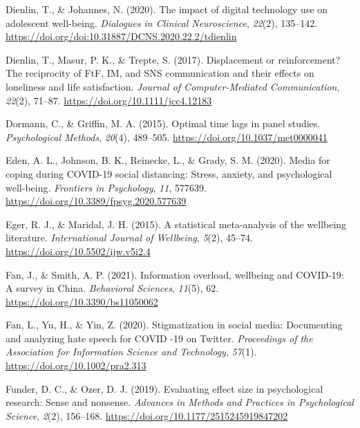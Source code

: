 \documentclass[
  man,mask,floatsintext]{apa7}
\newlength{\cslhangindent}
\newlength{\cslentryspacingunit} %
\newenvironment{CSLReferences}[2] %
 {%
  \setlength{\parindent}{0pt}
  \ifodd #1
  \let\oldpar\par
  \def\par{\hangindent=\cslhangindent\oldpar}
  \fi
  \setlength{\parskip}{#2\cslentryspacingunit}
 }%
 {}
\begin{document}
\begin{CSLReferences}{1}{0}
\leavevmode{}%
Dienlin, T., \& Johannes, N. (2020). The impact of digital technology use on adolescent well-being. \emph{Dialogues in Clinical Neuroscience}, \emph{22}(2), 135--142. \url{https://doi.org/doi:10.31887/DCNS.2020.22.2/tdienlin}

\leavevmode{}%
Dienlin, T., Masur, P. K., \& Trepte, S. (2017). Displacement or reinforcement? {The} reciprocity of {FtF}, {IM}, and {SNS} communication and their effects on loneliness and life satisfaction. \emph{Journal of Computer-Mediated Communication}, \emph{22}(2), 71--87. \url{https://doi.org/10.1111/jcc4.12183}

\leavevmode{}%
Dormann, C., \& Griffin, M. A. (2015). Optimal time lags in panel studies. \emph{Psychological Methods}, \emph{20}(4), 489--505. \url{https://doi.org/10.1037/met0000041}

\leavevmode{}%
Eden, A. L., Johnson, B. K., Reinecke, L., \& Grady, S. M. (2020). Media for coping during {COVID-19} social distancing: {Stress}, anxiety, and psychological well-being. \emph{Frontiers in Psychology}, \emph{11}, 577639. \url{https://doi.org/10.3389/fpsyg.2020.577639}

\leavevmode{}%
Eger, R. J., \& Maridal, J. H. (2015). A statistical meta-analysis of the wellbeing literature. \emph{International Journal of Wellbeing}, \emph{5}(2), 45--74. \url{https://doi.org/10.5502/ijw.v5i2.4}

\leavevmode{}%
Fan, J., \& Smith, A. P. (2021). Information overload, wellbeing and {COVID-19}: {A} survey in {China}. \emph{Behavioral Sciences}, \emph{11}(5), 62. \url{https://doi.org/10.3390/bs11050062}

\leavevmode{}%
Fan, L., Yu, H., \& Yin, Z. (2020). Stigmatization in social media: {Documenting} and analyzing hate speech for {\textsc{COVID}} -19 on {Twitter}. \emph{Proceedings of the Association for Information Science and Technology}, \emph{57}(1). \url{https://doi.org/10.1002/pra2.313}

\leavevmode{}%
Funder, D. C., \& Ozer, D. J. (2019). Evaluating effect size in psychological research: {Sense} and nonsense. \emph{Advances in Methods and Practices in Psychological Science}, \emph{2}(2), 156--168. \url{https://doi.org/10.1177/2515245919847202}


\end{CSLReferences}
\end{document}
